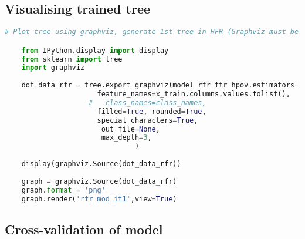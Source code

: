 \subsection*{Visualising trained tree}

\begin{lstlisting}[language=Python]
    # Plot tree using graphviz, generate 1st tree in RFR (Graphviz must be installed in local computer)

    from IPython.display import display
    from sklearn import tree
    import graphviz
    
    dot_data_rfr = tree.export_graphviz(model_rfr_ftr_hpov.estimators_[1], 
                      feature_names=x_train.columns.values.tolist(),  
                    #   class_names=class_names,  
                      filled=True, rounded=True,  
                      special_characters=True,
                       out_file=None,
                       max_depth=3,
                               )
    
    display(graphviz.Source(dot_data_rfr))
    
    graph = graphviz.Source(dot_data_rfr)
    graph.format = 'png'
    graph.render('rfr_mod_it1',view=True)
\end{lstlisting}

\subsection*{Cross-validation of model}

